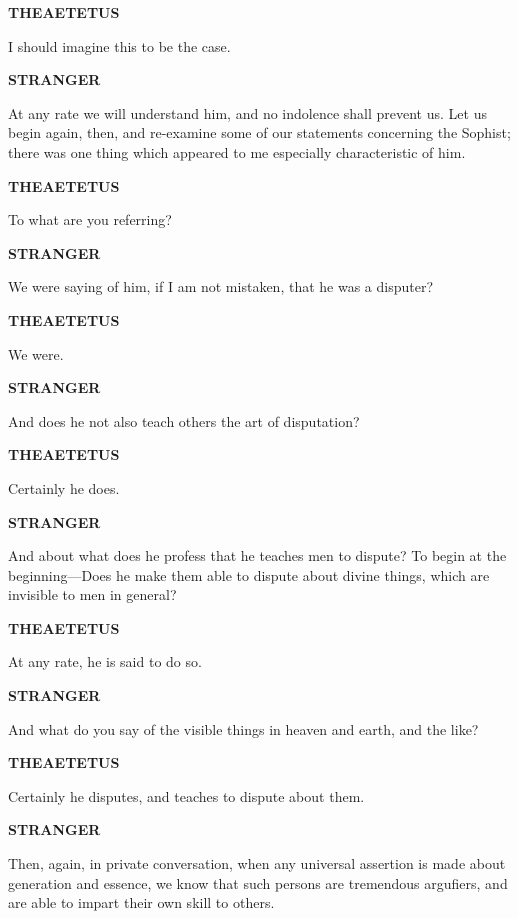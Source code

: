 \documentclass[11pt,letter]{article}
\begin{document}
\par \textbf{THEAETETUS}
\par   I should imagine this to be the case.

\par \textbf{STRANGER}
\par   At any rate we will understand him, and no indolence shall prevent us. Let us begin again, then, and re-examine some of our statements concerning the Sophist; there was one thing which appeared to me especially characteristic of him.

\par \textbf{THEAETETUS}
\par   To what are you referring?

\par \textbf{STRANGER}
\par   We were saying of him, if I am not mistaken, that he was a disputer?

\par \textbf{THEAETETUS}
\par   We were.

\par \textbf{STRANGER}
\par   And does he not also teach others the art of disputation?

\par \textbf{THEAETETUS}
\par   Certainly he does.

\par \textbf{STRANGER}
\par   And about what does he profess that he teaches men to dispute? To begin at the beginning—Does he make them able to dispute about divine things, which are invisible to men in general?

\par \textbf{THEAETETUS}
\par   At any rate, he is said to do so.

\par \textbf{STRANGER}
\par   And what do you say of the visible things in heaven and earth, and the like?

\par \textbf{THEAETETUS}
\par   Certainly he disputes, and teaches to dispute about them.

\par \textbf{STRANGER}
\par   Then, again, in private conversation, when any universal assertion is made about generation and essence, we know that such persons are tremendous argufiers, and are able to impart their own skill to others.
\end{document}
